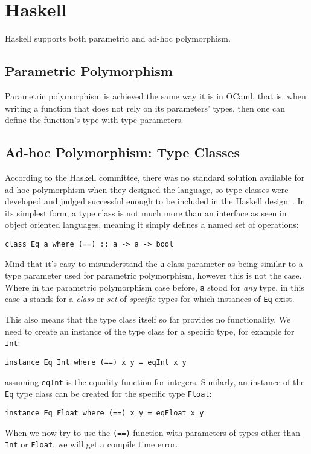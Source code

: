 \section{Haskell}

Haskell supports both parametric and ad-hoc polymorphism.

\subsection{Parametric Polymorphism}

Parametric polymorphism is achieved the same way it is in OCaml, that is, when writing a function that does not rely on its parameters' types, then one can define the function's type with type parameters.

\subsection{Ad-hoc Polymorphism: Type Classes}\label{haskell-type-classes}

According to the Haskell committee, there was no standard solution available for ad-hoc polymorphism when they designed the language, so type classes were developed and judged successful enough to be included in the Haskell design~\cite{type-classes-original}. In its simplest form, a type class is not much more than an interface as seen in object oriented languages, meaning it simply defines a named set of operations:
\begin{verbatim}
class Eq a where (==) :: a -> a -> bool
\end{verbatim}
Mind that it's easy to misunderstand the \verb|a| class parameter as being similar to a type parameter used for parametric polymorphism, however this is not the case. Where in the parametric polymorphism case before, \verb|a| stood for \textit{any} type, in this case \verb|a| stands for a \textit{class} or \textit{set} of \textit{specific} types for which instances of \verb|Eq| exist.

This also means that the type class itself so far provides no functionality. We need to create an instance of the type class for a specific type, for example for \verb|Int|:
\begin{verbatim}
instance Eq Int where (==) x y = eqInt x y
\end{verbatim}
assuming \verb|eqInt| is the equality function for integers. Similarly, an instance of the \verb|Eq| type class can be created for the specific type \verb|Float|:
\begin{verbatim}
instance Eq Float where (==) x y = eqFloat x y
\end{verbatim}
When we now try to use the \verb|(==)| function with parameters of types other than \verb|Int| or \verb|Float|, we will get a compile time error.

